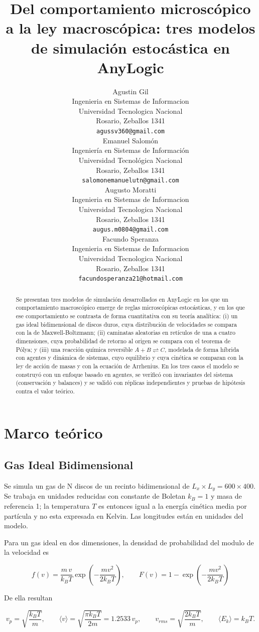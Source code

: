 \documentclass{article}
\title{Del comportamiento microscópico a la ley macroscópica: tres modelos de simulación estocástica en AnyLogic}
\author{
  Agustin Gil \\
  Ingenieria en Sistemas de Informacion\\
  Universidad Tecnologica Nacional\\
  Rosario, Zeballos 1341 \\
  \texttt{agussv360@gmail.com} \\
  \And
   Emanuel Salomón \\
  Ingeniería en Sistemas de Información\\
  Universidad Tecnológica Nacional\\
  Rosario, Zeballos 1341\\
  \texttt{salomonemanuelutn@gmail.com}\\
  \And
  Augusto Moratti \\
  Ingenieria en Sistemas de Informacion\\
  Universidad Tecnologica Nacional\\
  Rosario, Zeballos 1341 \\
  \texttt{augus.m0804@gmail.com} \\
\And
 Facundo Speranza \\
  Ingenieria en Sistemas de Informacion\\
  Universidad Tecnologica Nacional\\
  Rosario, Zeballos 1341 \\
  \texttt{facundosperanza21@hotmail.com} \\
}
\begin{document}
\maketitle

\begin{abstract}
Se presentan tres modelos de simulación desarrollados en AnyLogic en los que un comportamiento macroscópico emerge de reglas microscópicas estocásticas, y en los que ese comportamiento se contrasta de forma cuantitativa con su teoría analítica: (i) un gas ideal bidimensional de discos duros, cuya distribución de velocidades se compara con la de Maxwell-Boltzmann; (ii) caminatas aleatorias en retículos de una a cuatro dimensiones, cuya probabilidad de retorno al origen se compara con el teorema de Pólya; y (iii) una reacción química reversible $A + B \rightleftharpoons C$, modelada de forma híbrida con agentes y dinámica de sistemas, cuyo equilibrio y cuya cinética se comparan con la ley de acción de masas y con la ecuación de Arrhenius. En los tres casos el modelo se construyó con un enfoque basado en agentes, se verificó con invariantes del sistema (conservación y balances) y se validó con réplicas independientes y pruebas de hipótesis contra el valor teórico.
\end{abstract}


\section{Marco teórico}

\subsection{Gas Ideal Bidimensional}
Se simula un gas de N discos de un recinto bidimensional de $L_x\times L_y=600\times 400$. Se trabaja en unidades reducidas con constante de Boletan $k_B=1$ y masa de referencia 1; la temperatura $T$ es entonces igual a la energía cinética media por partícula y no esta expresada en Kelvin. Las longitudes están en unidades del modelo.

Para un gas ideal en dos dimensiones, la densidad de probabilidad del modulo de la velocidad es \\
\begin{center}
    $$f(v) = \frac{m\,v}{k_BT}\exp\!\left(-\frac{m v^2}{2k_BT}\right),\qquad F(v)=1-\exp\!\left(-\frac{m v^2}{2k_BT}\right)$$
\end{center}
De ella resultan \\
\begin{center}
    $$v_p=\sqrt{\frac{k_BT}{m}},\qquad \langle v\rangle=\sqrt{\frac{\pi k_BT}{2m}}=1.2533\,v_p,\qquad v_{rms}=\sqrt{\frac{2k_BT}{m}},\qquad \langle E_k\rangle=k_BT.$$
\end{center}
\end{document}
